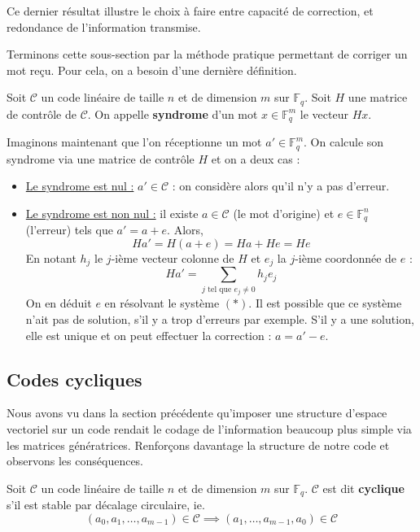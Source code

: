   Ce dernier résultat illustre le choix à faire entre capacité de correction, et redondance de l'information transmise.

  Terminons cette sous-section par la méthode pratique permettant de corriger un mot reçu. Pour cela, on a besoin d'une dernière définition.

  \begin{definition}
    Soit $\mathcal{C}$ un code linéaire de taille $n$ et de dimension $m$ sur $\mathbb{F}_q$. Soit $H$ une matrice de contrôle de $\mathcal{C}$. On appelle \textbf{syndrome} d'un mot $x \in \mathbb{F}_q^m$ le vecteur $Hx$.
  \end{definition}

  Imaginons maintenant que l'on réceptionne un mot $a' \in \mathbb{F}_q^m$. On calcule son syndrome via une matrice de contrôle $H$ et on a deux cas :

  \begin{itemize}
    \item \uline{Le syndrome est nul :} $a' \in \mathcal{C}$ : on considère alors qu'il n'y a pas d'erreur.
    \item \uline{Le syndrome est non nul :} il existe $a \in \mathcal{C}$ (le mot d'origine) et $e \in \mathbb{F}_q^n$ (l'erreur) tels que $a' = a + e$. Alors,
    \[ Ha' = H(a+e) = Ha + He = He \]
    En notant $h_j$ le $j$-ième vecteur colonne de $H$ et $e_j$ la $j$-ième coordonnée de $e$ :
    \[ Ha' = \sum_{j \text{ tel que } e_j \neq 0} h_j e_j \tag{$*$} \]
    On en déduit $e$ en résolvant le système $(*)$. Il est possible que ce système n'ait pas de solution, s'il y a trop d'erreurs par exemple. S'il y a une solution, elle est unique et on peut effectuer la correction : $a = a' - e$.
  \end{itemize}

  \subsection{Codes cycliques}

  Nous avons vu dans la section précédente qu'imposer une structure d'espace vectoriel sur un code rendait le codage de l'information beaucoup plus simple via les matrices génératrices. Renforçons davantage la structure de notre code et observons les conséquences.

  \begin{definition}
    Soit $\mathcal{C}$ un code linéaire de taille $n$ et de dimension $m$ sur $\mathbb{F}_q$. $\mathcal{C}$ est dit \textbf{cyclique} s'il est stable par décalage circulaire, ie.
    \[ (a_0, a_1, \dots, a_{m-1}) \in \mathcal{C} \implies (a_1, \dots, a_{m-1}, a_0) \in \mathcal{C} \]
  \end{definition}

